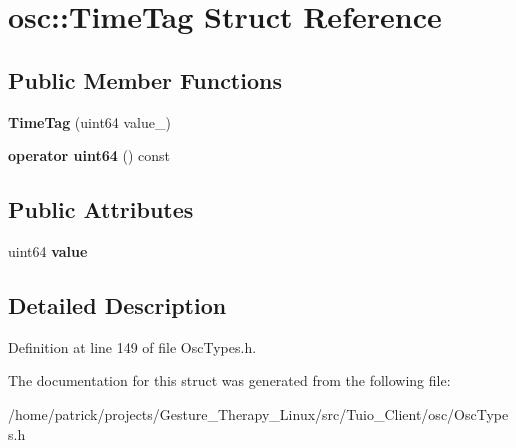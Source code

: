 \hypertarget{structosc_1_1_time_tag}{}\section{osc\+:\+:Time\+Tag Struct Reference}
\label{structosc_1_1_time_tag}
\subsection*{Public Member Functions}
\begin{DoxyCompactItemize}
\item 
\mbox{\label{structosc_1_1_time_tag_a5ca62112a8bf5cbb505fd9c11757e637}} 
{\bfseries Time\+Tag} (uint64 value\+\_\+)
\item 
\mbox{\label{structosc_1_1_time_tag_a987612cd86c90911e59b4d8646b2c5e9}} 
{\bfseries operator uint64} () const
\end{DoxyCompactItemize}
\subsection*{Public Attributes}
\begin{DoxyCompactItemize}
\item 
\mbox{\label{structosc_1_1_time_tag_a5d47526a890b1072255527ba0bbb44ea}} 
uint64 {\bfseries value}
\end{DoxyCompactItemize}


\subsection{Detailed Description}


Definition at line 149 of file Osc\+Types.\+h.



The documentation for this struct was generated from the following file\+:\begin{DoxyCompactItemize}
\item 
/home/patrick/projects/\+Gesture\+\_\+\+Therapy\+\_\+\+Linux/src/\+Tuio\+\_\+\+Client/osc/Osc\+Types.\+h\end{DoxyCompactItemize}
